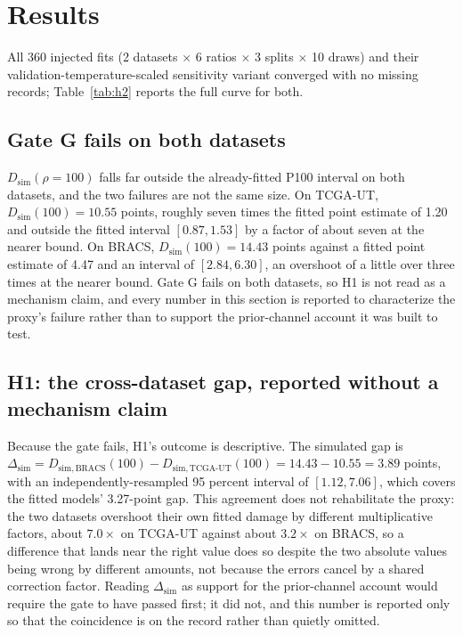 \section{Results}
\label{sec:results}
All 360 injected fits (2 datasets $\times$ 6 ratios $\times$ 3 splits $\times$ 10 draws) and their validation-temperature-scaled sensitivity variant converged with no missing records; Table~\ref{tab:h2} reports the full curve for both.

\subsection{Gate G fails on both datasets}
\label{sec:gate-result}
$D_{\mathrm{sim}}(\rho=100)$ falls far outside the already-fitted P100 interval on both datasets, and the two failures are not the same size. On TCGA-UT, $D_{\mathrm{sim}}(100)=10.55$ points, roughly seven times the fitted point estimate of 1.20 and outside the fitted interval $[0.87, 1.53]$ by a factor of about seven at the nearer bound. On BRACS, $D_{\mathrm{sim}}(100)=14.43$ points against a fitted point estimate of 4.47 and an interval of $[2.84, 6.30]$, an overshoot of a little over three times at the nearer bound. Gate G fails on both datasets, so H1 is not read as a mechanism claim, and every number in this section is reported to characterize the proxy's failure rather than to support the prior-channel account it was built to test.

\subsection{H1: the cross-dataset gap, reported without a mechanism claim}
\label{sec:h1-result}
Because the gate fails, H1's outcome is descriptive. The simulated gap is $\Delta_{\mathrm{sim}} = D_{\mathrm{sim,BRACS}}(100) - D_{\mathrm{sim,TCGA\text{-}UT}}(100) = 14.43 - 10.55 = 3.89$ points, with an independently-resampled 95 percent interval of $[1.12, 7.06]$, which covers the fitted models' 3.27-point gap. This agreement does not rehabilitate the proxy: the two datasets overshoot their own fitted damage by different multiplicative factors, about $7.0\times$ on TCGA-UT against about $3.2\times$ on BRACS, so a difference that lands near the right value does so despite the two absolute values being wrong by different amounts, not because the errors cancel by a shared correction factor. Reading $\Delta_{\mathrm{sim}}$ as support for the prior-channel account would require the gate to have passed first; it did not, and this number is reported only so that the coincidence is on the record rather than quietly omitted.

